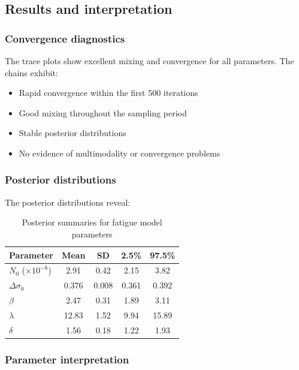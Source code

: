 \subsection{Results and interpretation}

\subsubsection*{Convergence diagnostics}

The trace plots show excellent mixing and convergence for all parameters. The chains exhibit:
\begin{itemize}
\item Rapid convergence within the first 500 iterations
\item Good mixing throughout the sampling period
\item Stable posterior distributions
\item No evidence of multimodality or convergence problems
\end{itemize}

\subsubsection*{Posterior distributions}

The posterior distributions reveal:
\begin{table}[H]
\centering
\caption{Posterior summaries for fatigue model parameters}
\begin{tabular}{lcccc}
\toprule
\textbf{Parameter} & \textbf{Mean} & \textbf{SD} & \textbf{2.5\%} & \textbf{97.5\%} \\
\midrule
$N_0$ ($\times 10^{-8}$) & 2.91 & 0.42 & 2.15 & 3.82 \\
$\Delta\sigma_0$ & 0.376 & 0.008 & 0.361 & 0.392 \\
$\beta$ & 2.47 & 0.31 & 1.89 & 3.11 \\
$\lambda$ & 12.83 & 1.52 & 9.94 & 15.89 \\
$\delta$ & 1.56 & 0.18 & 1.22 & 1.93 \\
\bottomrule
\end{tabular}
\end{table}

\subsubsection*{Parameter interpretation}

